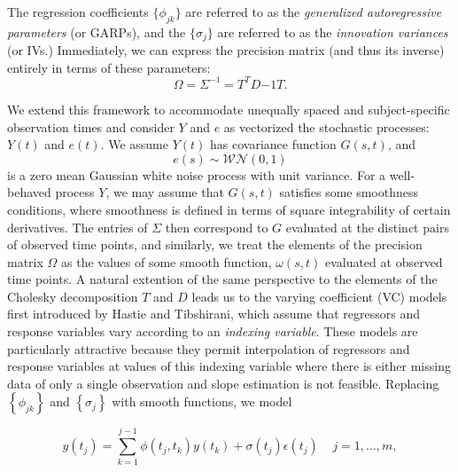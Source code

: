 \documentclass[12pt]{article}
\theoremstyle{definition}
\begin{document}
The regression coefficients $\lbrace \phi_{jk} \rbrace$ are referred to as the \emph{generalized autoregressive parameters} (or GARPs), and the $\lbrace \sigma_{j} \rbrace$ are referred to as the \emph{innovation variances} (or IVs.) Immediately, we can express the precision matrix (and thus its inverse) entirely in terms of these parameters:
\begin{equation} \label{eq:omega_decomp}
\Omega= \Sigma^{-1} = T^T D{-1} T.
\end{equation}

We extend this framework to accommodate unequally spaced and subject-specific observation times and consider $Y$ and $e$ as vectorized the stochastic processes: $Y\left(t\right)$ and $e\left(t\right)$.  We assume $Y\left(t\right)$ has covariance function $G\left(s,t\right)$, and
\[
e\left(s\right) \sim \mathcal{WN}\left(0,1\right)
\] 
is a zero mean Gaussian white noise process with unit variance. For a well-behaved process $Y$, we may assume that $G\left(s,t\right)$ satisfies some smoothness conditions, where smoothness is defined in terms of square integrability of certain derivatives. The entries of $\Sigma$ then correspond to $G$ evaluated at the distinct pairs of observed time points, and similarly, we treat the elements of the precision matrix $\Omega$ as the values of some smooth function, $\omega\left(s,t\right)$ evaluated at observed time points. A natural extention of the same perspective to the elements of the Cholesky decomposition $T$ and $D$ leads us to  %
the varying coefficient (VC) models first introduced by Hastie and Tibshirani, which assume that  regressors and response variables vary according to an \emph{indexing variable}. These models are particularly attractive because they permit interpolation of regressors and response variables at values of this indexing variable where there is either missing data of only a single observation and slope estimation is not feasible. Replacing  $\left \{ \phi_{jk} \right\}$ and $\left\{ \sigma_j \right\}$ with smooth functions, we model 

\begin{equation}   
y\left(t_j \right)  = \sum_{k=1}^{j-1} \phi\left(t_j ,t_k\right) y\left(t_k\right) + \sigma\left(t_j\right)\epsilon\left({t_j}\right) \;\;\;\; j=1,\dots, m, 
\label{eq:MyModel} 
\end{equation}
\end{document}
